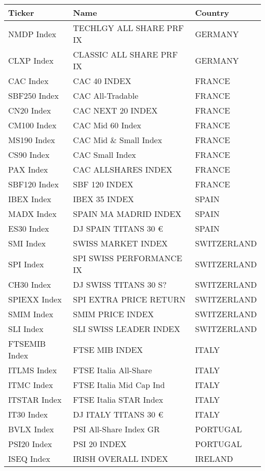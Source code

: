 \begin {table}[H]
\begin{center}
\small
\hspace*{-3cm}
\begin{tabu}{| l l l |} 
\hline
Ticker & Name & Country\\
\hline
NMDP Index & TECHLGY ALL SHARE PRF IX & GERMANY \\ 
CLXP Index & CLASSIC ALL SHARE PRF IX & GERMANY \\ 
CAC Index & CAC 40 INDEX & FRANCE \\ 
SBF250 Index & CAC All-Tradable & FRANCE \\ 
CN20 Index & CAC NEXT 20 INDEX & FRANCE \\ 
CM100 Index & CAC Mid 60 Index & FRANCE \\ 
MS190 Index & CAC Mid \& Small Index & FRANCE \\ 
CS90 Index & CAC Small Index & FRANCE \\ 
PAX Index & CAC ALLSHARES INDEX & FRANCE \\ 
SBF120 Index & SBF 120 INDEX & FRANCE \\ 
IBEX Index & IBEX 35 INDEX & SPAIN \\ 
MADX Index & SPAIN MA  MADRID INDEX & SPAIN \\ 
ES30 Index & DJ SPAIN TITANS 30 € & SPAIN \\ 
SMI Index & SWISS MARKET INDEX & SWITZERLAND \\ 
SPI Index & SPI SWISS PERFORMANCE IX & SWITZERLAND \\ 
CH30 Index & DJ SWISS TITANS 30 S? & SWITZERLAND \\ 
SPIEXX Index & SPI EXTRA PRICE RETURN & SWITZERLAND \\ 
SMIM Index & SMIM PRICE INDEX & SWITZERLAND \\ 
SLI Index & SLI SWISS LEADER INDEX & SWITZERLAND \\ 
FTSEMIB Index & FTSE MIB INDEX & ITALY \\ 
ITLMS Index & FTSE Italia All-Share & ITALY \\ 
ITMC Index & FTSE Italia Mid Cap Ind & ITALY \\ 
ITSTAR Index & FTSE Italia STAR Index & ITALY \\ 
IT30 Index & DJ ITALY TITANS 30 € & ITALY \\ 
BVLX Index & PSI All-Share Index GR & PORTUGAL \\ 
PSI20 Index & PSI 20 INDEX & PORTUGAL \\ 
ISEQ Index & IRISH OVERALL INDEX & IRELAND \\ 

\end{tabu}
\end{center}
\end{table}
